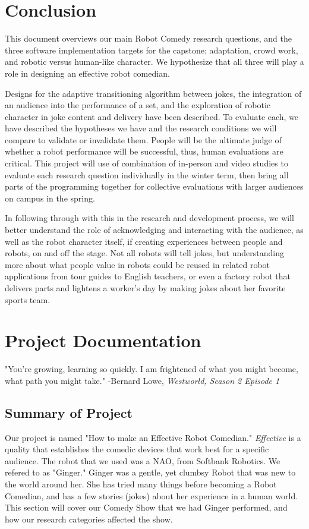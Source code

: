 \documentclass[onecolumn, draftclsnofoot,10pt, compsoc]{IEEEtran}
\begin{document}
\section{Conclusion}
This document overviews our main Robot Comedy research questions, and the three software implementation targets
for the capstone: adaptation, crowd work, and robotic versus human-like character. We hypothesize that all three will
play a role in designing an effective robot comedian.

Designs for the adaptive transitioning algorithm between jokes, the integration of an audience into the performance
of a set, and the exploration of robotic character in joke content and delivery have been described. To evaluate each,
we have described the hypotheses we have and the research conditions we will compare to validate or invalidate them.
People will be the ultimate judge of whether a robot performance will be successful, thus, human evaluations are critical.
This project will use of combination of in-person and video studies to evaluate each research question individually in
the winter term, then bring all parts of the programming together for collective evaluations with larger audiences on
campus in the spring.

In following through with this in the research and development process, we will better understand the role of
acknowledging and interacting with the audience, as well as the robot character itself, if creating experiences between
people and robots, on and off the stage. Not all robots will tell jokes, but understanding more about what people value
in robots could be reused in related robot applications from tour guides to English teachers, or even a factory robot that
delivers parts and lightens a worker’s day by making jokes about her favorite sports team.

\section{Project Documentation}

	\begin{displayquote}
	"You're growing, learning so quickly. I am frightened of what you might become, what path you might take."
	-Bernard Lowe, \textit{Westworld, Season 2 Episode 1}
	\end{displayquote}

\subsection{Summary of Project}
Our project is named "How to make an Effective Robot Comedian." 
\textit{Effective} is a quality that establishes the comedic devices that work best for a specific audience.
The robot that we used was a NAO, from Softbank Robotics. We refered to as "Ginger." 
Ginger was a gentle, yet clumbsy Robot that was new to the world around her.
She has tried many things before becoming a Robot Comedian, and has a few stories (jokes) about her experience in a human world.
This section will cover our Comedy Show that we had Ginger performed, and how our research categories affected the show.
\end{document}
